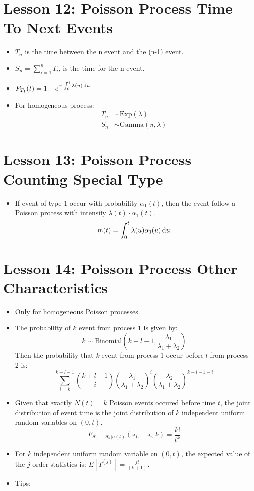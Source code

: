 \documentclass[10pt, french]{article}
\begin{document}
\begin{multicols*}{3}
\section*{Lesson 12: Poisson Process Time To Next Events}
\begin{itemize}[align=left,leftmargin=*]
    \item $T_n$ is the time between the n event and the (n-1) event.
    \item $S_n = \sum_{i=1}^n T_i$, is the time for the n event.
    \item $F_{T_1}(t)=1-e^{-\int_0^t \lambda(u) \mathop{}\!\mathrm{d}{u}}$
    \item For homogeneous process:
    \begin{align*}
        T_n &\sim \mathrm{Exp}(\lambda) \\
        S_n &\sim \mathrm{Gamma}(n, \lambda)
    \end{align*}
\end{itemize}

\section*{Lesson 13: Poisson Process Counting Special Type}
\label{Lesson 13}
\begin{itemize}[align=left,leftmargin=*]
    \item If event of type 1 occur with probability $\alpha_1(t)$, then the event follow a Poisson process with intensity $\lambda(t) \cdot  \alpha_1(t)$. \[ m(t)=\int_0^t \lambda(u)\alpha_1(u) \mathop{}\!\mathrm{d}{u} \]
\end{itemize}

\section*{Lesson 14: Poisson Process Other Characteristics}
\begin{itemize}[align=left,leftmargin=*]
    \item Only for homogeneous Poisson processes.
    \item The probability of $k$ event from process 1 is given by: \[ k \sim \mathrm{Binomial}\left( k+l-1, \frac{\lambda_1}{\lambda_1 + \lambda_2} \right) \] Then the probability that $k$ event from process 1 occur before $l$ from process 2 is: \[ \sum_{i=k}^{k+l-1} \binom{k+l-1}{i} \left( \frac{\lambda_1}{\lambda_1+\lambda_2} \right)^i \left(\frac{\lambda_2}{\lambda_1+\lambda_2}\right)^{k+l-1-i} \]
    \item Given that exactly $N(t) = k$ Poisson events occured before time $t$, the joint distribution of event time is the joint distribution of $k$ independent uniform random variables on $(0, t)$. \[ F_{S_1,...,S_n|n(t)}(s_1,...s_n|k) = \frac{k!}{t^k} \]
    \item For $k$ independent uniform random variable on $(0, t)$, the expected value of the $j$ order statistics is: $E[T^{(j)}] =  \frac{jt}{(k+1)} $.
    \item Tips: {\color{AppendixColor}}
\end{itemize}


\end{multicols*}
\end{document}
